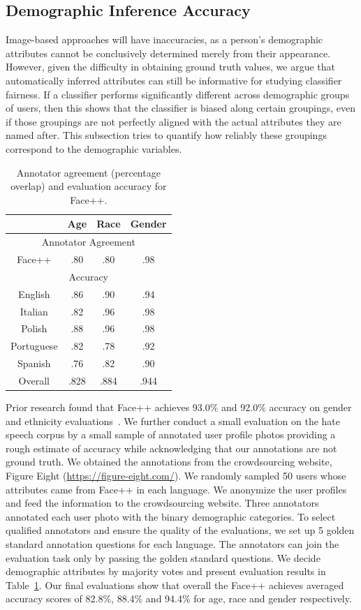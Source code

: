\subsection{Demographic Inference Accuracy}

Image-based approaches will have inaccuracies, as a person's demographic attributes cannot be conclusively determined merely from their appearance. 
However, given the difficulty in obtaining ground truth values, we argue that automatically inferred attributes can still be informative for studying classifier fairness. 
If a classifier performs significantly different across demographic groups of users, then this shows that the classifier is biased along certain groupings, even if those groupings are not perfectly aligned with the actual attributes they are named after. 
This subsection tries to quantify how reliably these groupings correspond to the demographic variables.


\begin{table}[b!]
\centering
\begin{tabular}{c||c|c|c}
 & Age & Race & Gender \\ \hline
\multicolumn{4}{c}{Annotator Agreement} \\ \hline
Face++ & .80 & .80 & .98 \\ \hline
\multicolumn{4}{c}{Accuracy} \\ \hline
English & .86 & .90 & .94 \\ \hline
Italian & .82 & .96 & .98 \\ \hline
Polish & .88 & .96 & .98 \\ \hline
Portuguese & .82 & .78 & .92 \\ \hline
Spanish & .76 & .82 & .90 \\ \hline
Overall & .828 & .884 & .944 \\ 
\end{tabular}
\caption{Annotator agreement (percentage overlap) and evaluation accuracy for Face++.}
\label{chap5:tab:api_eval}
\end{table}

Prior research found that Face++ achieves 93.0\% and 92.0\% accuracy on gender and ethnicity evaluations~\cite{jung2018assessing}.
We further conduct a small evaluation on the hate speech corpus by a small sample of annotated user profile photos providing a rough estimate of accuracy while acknowledging that our annotations are not ground truth.
We obtained the annotations from the crowdsourcing website, Figure Eight (\url{https://figure-eight.com/}).
We randomly sampled 50 users whose attributes came from Face++ in each language.
We anonymize the user profiles and feed the information to the crowdsourcing website.
Three annotators annotated each user photo with the binary demographic categories.
To select qualified annotators and ensure the quality of the evaluations, we set up 5 golden standard annotation questions for each language.
The annotators can join the evaluation task only by passing the golden standard questions.
We decide demographic attributes by majority votes and present evaluation results in Table~\ref{chap5:tab:api_eval}.
Our final evaluations show that overall the Face++ achieves averaged accuracy scores of 82.8\%, 88.4\% and 94.4\% for age, race and gender respectively.

